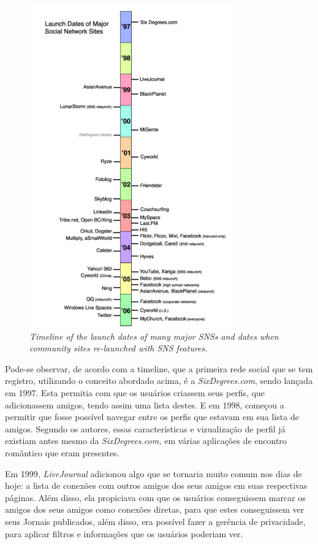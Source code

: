 \begin{figure}[h]
    \centering
    \includegraphics[width=330px, scale=1]{figuras/historicosns}
    \caption{\textit{Timeline of the launch dates of many major SNSs and dates when community sites
re-launched with SNS features. }}
    \label{fig:historicosns}
\end{figure}

Pode-se observar, de acordo com a timeline, que a primeira rede social que se tem
registro, utilizando o conceito abordado acima, é a \textit{SixDegrees.com}, sendo lançada
em 1997. Esta permitia com que os usuários criassem seus perfis, que adicionassem
amigos, tendo assim uma lista destes. E em 1998, começou a permitir que fosse possível
navegar entre os perfis que estavam em sua lista de amigos. Segundo os autores,
essas características e vizualização de perfil já existiam antes mesmo da \textit{SixDegrees.com,}
em várias aplicações de encontro romântico que eram presentes.

Em 1999, \textit{LiveJournal} adicionou algo que se tornaria muito comum nos dias de hoje:
a lista de conexões com outros amigos dos seus amigos em suas respectivas páginas.
Além disso, ela propiciava com que os usuários conseguissem marcar os amigos
dos seus amigos como conexões diretas, para que estes conseguissem ver seus Jornais
publicados, além disso, era possível fazer a gerência de privacidade, para
aplicar filtros e informações que os usuários poderiam ver.

